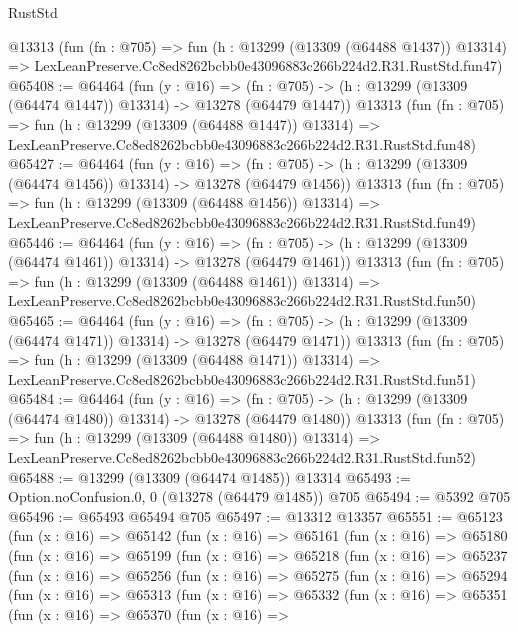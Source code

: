 \begin{lexlean}{RustStd}
\begin{coremodule}
    @13313
    (fun (fn : @705) =>
    fun (h : @13299 (@13309 (@64488 @1437)) @13314) =>
    LexLeanPreserve.Cc8ed8262bcbb0e43096883c266b224d2.R31.RustStd.fun47)
@65408 := @64464
    (fun (y : @16) =>
    (fn : @705) -> (h : @13299 (@13309 (@64474 @1447)) @13314) -> @13278 (@64479 @1447))
    @13313
    (fun (fn : @705) =>
    fun (h : @13299 (@13309 (@64488 @1447)) @13314) =>
    LexLeanPreserve.Cc8ed8262bcbb0e43096883c266b224d2.R31.RustStd.fun48)
@65427 := @64464
    (fun (y : @16) =>
    (fn : @705) -> (h : @13299 (@13309 (@64474 @1456)) @13314) -> @13278 (@64479 @1456))
    @13313
    (fun (fn : @705) =>
    fun (h : @13299 (@13309 (@64488 @1456)) @13314) =>
    LexLeanPreserve.Cc8ed8262bcbb0e43096883c266b224d2.R31.RustStd.fun49)
@65446 := @64464
    (fun (y : @16) =>
    (fn : @705) -> (h : @13299 (@13309 (@64474 @1461)) @13314) -> @13278 (@64479 @1461))
    @13313
    (fun (fn : @705) =>
    fun (h : @13299 (@13309 (@64488 @1461)) @13314) =>
    LexLeanPreserve.Cc8ed8262bcbb0e43096883c266b224d2.R31.RustStd.fun50)
@65465 := @64464
    (fun (y : @16) =>
    (fn : @705) -> (h : @13299 (@13309 (@64474 @1471)) @13314) -> @13278 (@64479 @1471))
    @13313
    (fun (fn : @705) =>
    fun (h : @13299 (@13309 (@64488 @1471)) @13314) =>
    LexLeanPreserve.Cc8ed8262bcbb0e43096883c266b224d2.R31.RustStd.fun51)
@65484 := @64464
    (fun (y : @16) =>
    (fn : @705) -> (h : @13299 (@13309 (@64474 @1480)) @13314) -> @13278 (@64479 @1480))
    @13313
    (fun (fn : @705) =>
    fun (h : @13299 (@13309 (@64488 @1480)) @13314) =>
    LexLeanPreserve.Cc8ed8262bcbb0e43096883c266b224d2.R31.RustStd.fun52)
@65488 := @13299 (@13309 (@64474 @1485)) @13314
@65493 := Option.noConfusion.{0, 0} (@13278 (@64479 @1485)) @705
@65494 := @5392 @705
@65496 := @65493 @65494 @705
@65497 := @13312 @13357
@65551 := @65123
    (fun (x : @16) =>
    @65142
      (fun (x : @16) =>
      @65161
        (fun (x : @16) =>
        @65180
          (fun (x : @16) =>
          @65199
            (fun (x : @16) =>
            @65218
              (fun (x : @16) =>
              @65237
                (fun (x : @16) =>
                @65256
                  (fun (x : @16) =>
                  @65275
                    (fun (x : @16) =>
                    @65294
                      (fun (x : @16) =>
                      @65313
                        (fun (x : @16) =>
                        @65332
                          (fun (x : @16) =>
                          @65351
                            (fun (x : @16) =>
                            @65370
                              (fun (x : @16) =>

\end{coremodule}
\end{lexlean}
